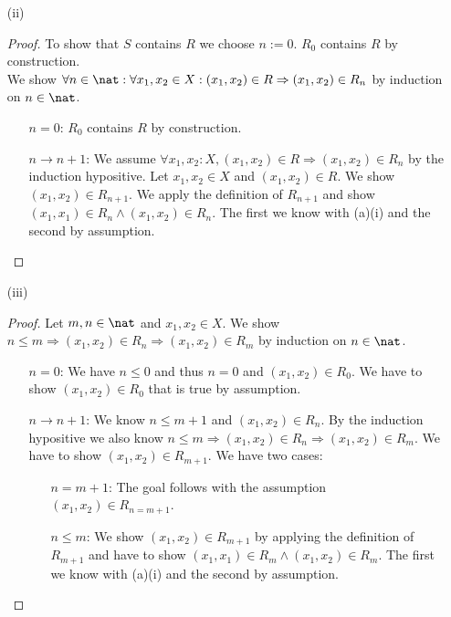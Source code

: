 \begin{answer}
\begin{itemize}
\begin{itemize}
        \item[(ii)]
          \begin{proof}
            To show that $S$ contains $R$ we choose $n := 0$. $R_0$ contains $R$ by construction. \\
            We show $\forall n\in\nat: \forall x_1,x_2\in X: (x_1, x_2) \in R \Rightarrow (x_1, x_2) \in R_n$ by induction on $n\in\nat$.
            \begin{itemize}
              \item[$n=0$:]
                $R_0$ contains $R$ by construction.
              \item[$n \rightarrow n+1$:]
                We assume $\forall x_1, x_2 : X, (x_1, x_2) \in R \Rightarrow (x_1, x_2) \in R_n$ by the induction hypositive.
                Let $x_1, x_2 \in X$ and $(x_1, x_2) \in R$. We show $(x_1, x_2) \in R_{n+1}$.
                We apply the definition of $R_{n+1}$ and show $(x_1, x_1) \in R_n \land (x_1, x_2) \in R_n$.
                The first we know with (a)(i) and the second by assumption. \qedhere
            \end{itemize}
          \end{proof} %

        \item[(iii)]
          \begin{proof}
            Let $m,n\in\nat$ and $x_1, x_2 \in X$. We show $n \le m \Rightarrow (x_1, x_2) \in R_n \Rightarrow (x_1, x_2) \in R_m$ by induction on $n\in\nat$.
            \begin{itemize}
              \item[$n=0$:]
                We have $n \le 0$ and thus $n = 0$ and $(x_1, x_2) \in R_0$. We have to show $(x_1, x_2) \in R_0$ that is true by assumption.
              \item[$n \rightarrow n+1$:]
                We know $n \le m+1$ and $(x_1, x_2) \in R_n$. By the induction hypositive we also know
                $n \le m \Rightarrow (x_1, x_2) \in R_n \Rightarrow (x_1, x_2) \in R_m$.
                We have to show $(x_1, x_2) \in R_{m+1}$. We have two cases:
                \begin{itemize}
                  \item[$n = m+1$:]
                    The goal follows with the assumption $(x_1, x_2) \in R_{n=m+1}$.
                  \item[$n \le m$:]
                    We show $(x_1, x_2) \in R_{m+1}$ by applying the definition of $R_{m+1}$ and have to show $(x_1, x_1) \in R_m \land (x_1, x_2) \in R_m$.
                    The first we know with (a)(i) and the second by assumption. \qedhere
                \end{itemize}
            \end{itemize}
          \end{proof} %


\end{itemize}
\end{itemize}
\end{answer}

